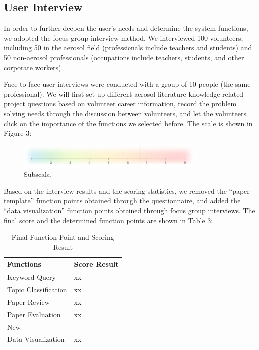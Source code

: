 \subsection{User Interview}
In order to further deepen the user's needs and determine the system functions, we adopted the focus group interview method. We interviewed 100 volunteers, including 50 in the aerosol field (professionals include teachers and students) and 50 non-aerosol professionals (occupations include teachers, students, and other corporate workers). 

Face-to-face user interviews were conducted with a group of 10 people (the same professional). We will first set up different aerosol literature knowledge related project questions based on volunteer career information, record the problem solving needs through the discussion between volunteers, and let the volunteers click on the importance of the functions we selected before. The scale is shown in Figure 3:

\begin{figure}
	\includegraphics[width=0.8\textwidth]{figures/pic3.pdf}
	\caption{Subscale.}
\end{figure}

Based on the interview results and the scoring statistics, we removed the “paper template” function points obtained through the questionnaire, and added the “data visualization” function points obtained through focus group interviews. The final score and the determined function points are shown in Table 3:

\begin{table}
	\caption{Final Function Point and Scoring Result}
	\label{tab:freq}
	\begin{tabular}{ll}
		\toprule
		Functions&Score Result\\
		\midrule
		Keyword Query & xx\\
		Topic Classification & xx\\
		Paper Review & xx\\
		Paper Evaluation & xx\\
		\midrule
		New\\
		Data Visualization & xx\\
		\bottomrule
	\end{tabular}
\end{table}

